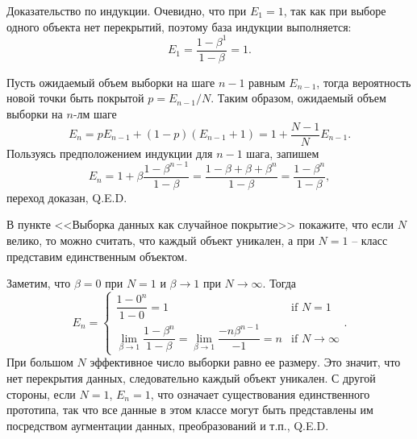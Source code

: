 \begin{solution}
    Доказательство по индукции. Очевидно, что при $E_1=1$, так как при выборе одного объекта нет перекрытий, поэтому база индукции выполняется:
    \[
        E_1=\dfrac{1-\beta^1}{1-\beta}=1.
    \]

    Пусть ожидаемый объем выборки на шаге $n-1$ равным $E_{n-1}$, тогда вероятность новой точки быть покрытой $p=E_{n-1}/N$. Таким образом, ожидаемый объем выборки на $n$-лм шаге
    \[
        E_n=pE_{n-1}+(1-p)(E_{n-1}+1)=1+\dfrac{N-1}{N}E_{n-1}.
    \]
    Пользуясь предположением индукции для $n-1$ шага, запишем
    \[
        E_n=1+\beta\dfrac{1-\beta^{n-1}}{1-\beta}=\dfrac{1-\beta+\beta+\beta^{n}}{1-\beta}=\dfrac{1-\beta^{n}}{1-\beta},
    \]
    переход доказан, Q.E.D.
\end{solution}

\begin{problem}
    В пункте <<Выборка данных как случайное покрытие>>  покажите, что если $N$ велико, то можно считать, что каждый объект уникален, а при $N=1$ -- класс представим единственным объектом.
\end{problem}

\begin{solution}
    Заметим, что $\beta=0$ при $N=1$ и $\beta \to 1$ при $N \to \infty$. Тогда
    \[
        E_n=\begin{cases}
            \dfrac{1-0^n}{1-0}=1 & \text{if } N=1 \\
            \lim\limits_{\beta \to 1}\dfrac{1-\beta^n}{1-\beta}=\lim\limits_{\beta \to 1}\dfrac{-n\beta^{n-1}}{-1}=n & \text{if } N \to \infty
        \end{cases}.
    \]
    При большом $N$ эффективное число выборки равно ее размеру. Это значит, что нет перекрытия данных, следовательно каждый объект уникален. С другой стороны, если $N=1$, $E_n=1$, что означает существования единственного прототипа, так что все данные в этом классе могут быть представлены им посредством аугментации данных, преобразований и т.п., Q.E.D.
\end{solution}

